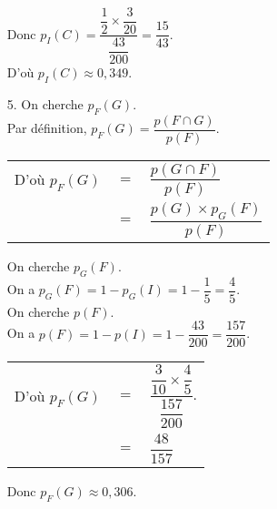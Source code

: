 \begin{itemize}
\vspace*{.6cm}

Donc $p_I\left(C\right) = \dfrac{\dfrac{1}{2} \times \dfrac{3}{20}}{\dfrac{43}{200}} = \dfrac{15}{43}$. \vspace*{.3cm} \\

D'où $p_I\left(C\right) \approx 0,349$. \vspace*{.3cm} \\

\item[5.] On cherche $p_F\left(G\right)$. \vspace*{.3cm} \\

Par définition, $p_F\left(G\right) = \dfrac{p\left(F \cap G\right)}{p\left(F\right)}$. \vspace*{.3cm} \\

\begin{tabular}{lll}
\hspace*{-.3cm} D'où $p_F\left(G\right)$ & $ = $ & $ \dfrac{p\left(G \cap F\right)}{p\left(F\right)}$ \vspace*{.3cm} \\
& $=$ & $\dfrac{p\left(G\right) \times p_G\left(F\right)}{p\left(F\right)}$ \\
\end{tabular}

\vspace*{.6cm}

On cherche $p_G\left(F\right)$. \vspace*{.3cm} \\

On a $p_G\left(F\right) = 1 - p_G\left(I\right) = 1 - \dfrac{1}{5} = \dfrac{4}{5}$. \vspace*{.3cm} \\

On cherche $p\left(F\right)$. \\

On a $p\left(F\right) = 1 - p\left(I\right) = 1 - \dfrac{43}{200} = \dfrac{157}{200}$. \vspace*{.3cm} \\

\begin{tabular}{lll}
\hspace*{-.3cm} D'où $p_F\left(G\right)$ & $=$ & $\dfrac{\dfrac{3}{10} \times \dfrac{4}{5}}{\dfrac{157}{200}}$. \vspace*{.3cm} \\
& $=$ & $\dfrac{48}{157}$ \\
\end{tabular}

\vspace*{.6cm}

Donc $p_F\left(G\right) \approx 0,306$.

\end{itemize}

